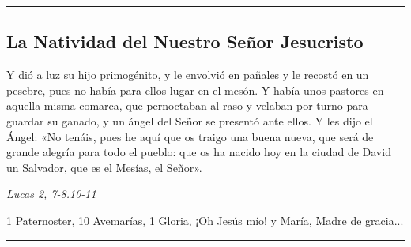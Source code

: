 \documentclass[11pt,a4paper]{book}
\begin{document}
    \rule{\textwidth}{0.5pt}
    

    \subsection*{La Natividad del Nuestro Señor Jesucristo}

    Y dió a luz su hijo primogénito, y le envolvió en pañales y le recostó en un pesebre, pues no había para ellos lugar en el mesón. 
    Y había unos pastores en aquella misma comarca, que pernoctaban al raso y velaban por turno para guardar su ganado, 
    y un ángel del  Señor se presentó ante ellos. Y les dijo el Ángel: «No tenáis, pues he aquí que os traigo una buena nueva, 
    que será de grande alegría para todo el pueblo: que os ha nacido hoy en la ciudad de David un Salvador, que es el Mesías, el Señor».

    \begin{flushright}
        \emph{Lucas 2, 7-8.10-11}
    \end{flushright}    

    1 Paternoster, 10 Avemarías, 1 Gloria, ¡Oh Jesús mío! y María, Madre de gracia...
    
    \rule{\textwidth}{0.5pt}
\end{document}
